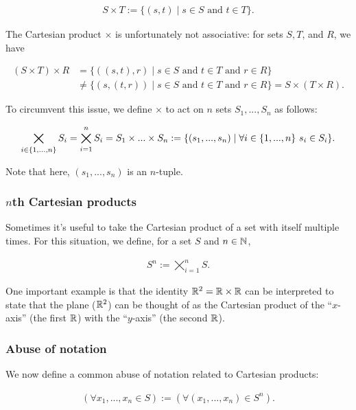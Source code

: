 \begin{align*}
    S \times T := \{(s, t) \mid s \in S \text{ and } t \in T\}.
\end{align*}

The Cartesian product $\times$ is unfortunately not associative: for sets $S, T$, and $R$, we have

\begin{align*}
    (S \times T) \times R &= \{ ((s, t), r) \mid s \in S \text{ and } t \in T \text{ and } r \in R\} \\ &\neq \{(s, (t, r)) \mid s \in S \text{ and } t \in T \text{ and } r \in R\} = S \times (T \times R).
\end{align*}

To circumvent this issue, we define $\times$ to act on $n$ sets $S_1, ..., S_n$ as follows:

\begin{align*}
    \bigtimes_{i \in \{1, ..., n\}} S_i = \bigtimes_{i = 1}^n S_i = S_1 \times ... \times S_n := \{(s_1, ..., s_n) \mid \forall i \in \{1, ..., n\} \text{ } s_i \in S_i\}.
\end{align*}

Note that here, $(s_1, ..., s_n)$ is an $n$-tuple.

\subsubsection*{$n$th Cartesian products}

Sometimes it's useful to take the Cartesian product of a set with itself multiple times. For this situation, we define, for a set $S$ and $n \in \mathbb{N}$,

\begin{align*}
    S^n := \bigtimes_{i = 1}^n S.
\end{align*}

One important example is that the identity $\mathbb{R}^2 = \mathbb{R} \times \mathbb{R}$ can be interpreted to state that the plane ($\mathbb{R}^2$) can be thought of as the Cartesian product of the ``$x$-axis'' (the first $\mathbb{R}$) with the ``$y$-axis'' (the second $\mathbb{R}$).

\subsubsection*{Abuse of notation}

We now define a common abuse of notation related to Cartesian products:

\begin{align*}
    (\forall x_1, ..., x_n \in S) := (\forall (x_1, ..., x_n) \in S^n).
\end{align*}


